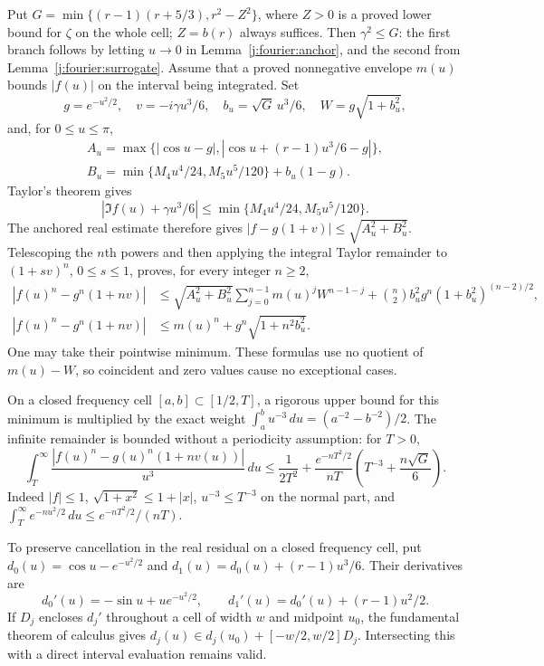 Put $G=\min\{(r-1)(r+5/3),r^2-Z^2\}$, where $Z>0$ is a proved
lower bound for $\zeta$ on the whole cell; $Z=b(r)$ always suffices.
Then $\gamma^2\le G$: the first branch follows by letting $u\to0$ in
Lemma~\ref{j:fourier:anchor}, and the second from
Lemma~\ref{j:fourier:surrogate}.
Assume that a proved nonnegative envelope $m(u)$ bounds $|f(u)|$ on
the interval being integrated. Set
\[
 g=e^{-u^2/2},\quad v=-i\gamma u^3/6,\quad
 b_u=\sqrt G\,u^3/6,\quad W=g\sqrt{1+b_u^2},
\]
and, for $0\le u\le\pi$,
\[
 \begin{gathered}
 A_u=\max\{|\cos u-g|,
 |\cos u+(r-1)u^3/6-g|\},\\
 B_u=\min\{M_4u^4/24, M_5u^5/120\}+b_u(1-g).
 \end{gathered}
\]
Taylor's theorem gives
\[
 |\Im f(u)+\gamma u^3/6|\le\min\{M_4u^4/24,M_5u^5/120\}.
\]
The anchored real estimate therefore gives
$|f-g(1+v)|\le\sqrt{A_u^2+B_u^2}$. Telescoping the $n$th powers and
then applying the integral Taylor remainder to $(1+sv)^n$, $0\le s\le1$,
proves, for every integer $n\ge2$,
\begin{align*}
 |f(u)^n-g^n(1+nv)|
 &\le\sqrt{A_u^2+B_u^2}\sum_{j=0}^{n-1}m(u)^jW^{n-1-j}
 +\binom n2 b_u^2g^n(1+b_u^2)^{(n-2)/2},\\
 |f(u)^n-g^n(1+nv)|
 &\le m(u)^n+g^n\sqrt{1+n^2b_u^2}.
\end{align*}
One may take their pointwise minimum. These formulas use no quotient of
$m(u)-W$, so coincident and zero values cause no exceptional cases.

On a closed frequency cell $[a,b]\subset[1/2,T]$, a rigorous upper
bound for this minimum is multiplied by the exact weight
$\int_a^b u^{-3}\,du=(a^{-2}-b^{-2})/2$. The infinite remainder is
bounded without a periodicity assumption: for $T>0$,
\[
 \int_T^\infty\frac{|f(u)^n-g(u)^n(1+nv(u))|}{u^3}\,du
 \le\frac1{2T^2}
 +\frac{e^{-nT^2/2}}{nT}
 \left(T^{-3}+\frac{n\sqrt G}{6}\right).
\]
Indeed $|f|\le1$, $\sqrt{1+x^2}\le1+|x|$, $u^{-3}\le T^{-3}$
on the normal part, and
$\int_T^\infty e^{-nu^2/2}\,du\le e^{-nT^2/2}/(nT)$.

To preserve cancellation in the real residual on a closed frequency cell,
put $d_0(u)=\cos u-e^{-u^2/2}$ and
$d_1(u)=d_0(u)+(r-1)u^3/6$. Their derivatives are
\[
 d_0'(u)=-\sin u+ue^{-u^2/2},\qquad
 d_1'(u)=d_0'(u)+(r-1)u^2/2.
\]
If $D_j$ encloses $d_j'$ throughout a cell of width $w$ and midpoint
$u_0$, the fundamental theorem of calculus gives
$d_j(u)\in d_j(u_0)+[-w/2,w/2]D_j$.
Intersecting this with a direct interval evaluation remains valid.

